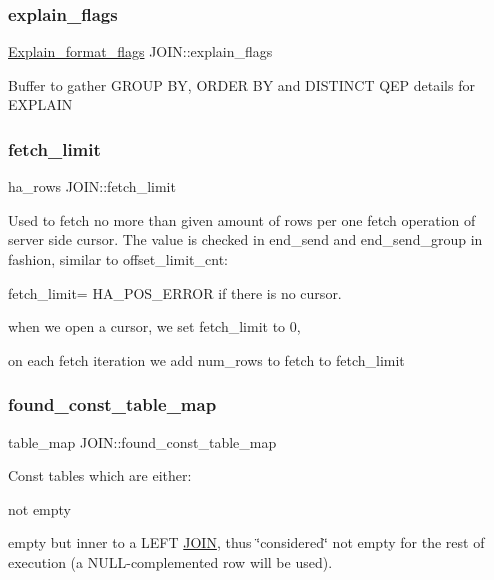 \subsubsection{\texorpdfstring{explain\+\_\+flags}{explain\_flags}}
{\footnotesize\ttfamily \mbox{\hyperlink{classExplain__format__flags}{Explain\+\_\+format\+\_\+flags}} J\+O\+I\+N\+::explain\+\_\+flags}

Buffer to gather G\+R\+O\+UP BY, O\+R\+D\+ER BY and D\+I\+S\+T\+I\+N\+CT Q\+EP details for E\+X\+P\+L\+A\+IN \mbox{\label{classJOIN_a0f59ebaac87aaddbf8aac00e28d1aac0}} 
\subsubsection{\texorpdfstring{fetch\+\_\+limit}{fetch\_limit}}
{\footnotesize\ttfamily ha\+\_\+rows J\+O\+I\+N\+::fetch\+\_\+limit}

Used to fetch no more than given amount of rows per one fetch operation of server side cursor. The value is checked in end\+\_\+send and end\+\_\+send\+\_\+group in fashion, similar to offset\+\_\+limit\+\_\+cnt\+:
\begin{DoxyItemize}
\item fetch\+\_\+limit= H\+A\+\_\+\+P\+O\+S\+\_\+\+E\+R\+R\+OR if there is no cursor.
\item when we open a cursor, we set fetch\+\_\+limit to 0,
\item on each fetch iteration we add num\+\_\+rows to fetch to fetch\+\_\+limit 
\end{DoxyItemize}\mbox{\label{classJOIN_a4d7b5537fed06b1b5cf1ba9c360748f2}} 
\subsubsection{\texorpdfstring{found\+\_\+const\+\_\+table\+\_\+map}{found\_const\_table\_map}}
{\footnotesize\ttfamily table\+\_\+map J\+O\+I\+N\+::found\+\_\+const\+\_\+table\+\_\+map}

Const tables which are either\+:
\begin{DoxyItemize}
\item not empty
\item empty but inner to a L\+E\+FT \mbox{\hyperlink{classJOIN}{J\+O\+IN}}, thus \char`\"{}considered\char`\"{} not empty for the rest of execution (a N\+U\+LL-\/complemented row will be used). 
\end{DoxyItemize}\mbox{\label{classJOIN_ac1f17fa2397efcd2f1c9fd378ac991b6}} 
